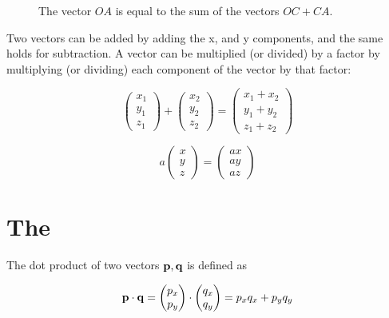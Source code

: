 \begin{figure}[h]
\begin{center}
  \caption{\small The vector $OA$ is equal to the sum of the vectors $OC + CA$.}
\end{center}
\end{figure}

Two vectors can be added by adding the x, and y components, and the same holds for 
subtraction. A vector can be multiplied (or divided) by a factor by multiplying 
(or dividing) each component of the vector by that factor:

$$
     \begin{pmatrix} x_1 \\ y_1 \\ z_1 \end{pmatrix} +
     \begin{pmatrix} x_2 \\ y_2 \\ z_2 \end{pmatrix} 
= \begin{pmatrix} x_1 + x_2 \\ y_1 + y_2 \\ z_1 + z_2 \end{pmatrix}
$$

$$
     a \begin{pmatrix} x \\ y \\ z \end{pmatrix} = \begin{pmatrix} ax \\ ay \\ az \end{pmatrix}
$$

\section{The }

The dot product of two vectors $\mathbf{p}, \mathbf{q}$  is defined as 

$$
    \mathbf{p}\cdot\mathbf{q} = \begin{pmatrix} p_x \\ p_y \end{pmatrix} \cdot \begin{pmatrix} q_x \\ q_y \end{pmatrix}  
    = p_xq_x + p_yq_y
$$

